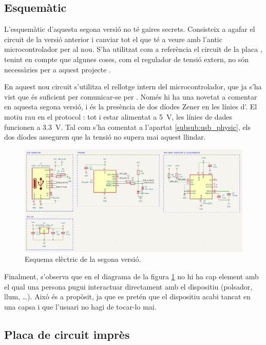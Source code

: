 \subsection{Esquemàtic}

L'esquemàtic d'aquesta segona versió no té gaires secrets. Consisteix a agafar
el circuit de la versió anterior i canviar tot el que té a veure amb l'antic
microcontrolador per al nou. S'ha utilitzat com a referència el circuit de la
placa , tenint en compte que algunes coses, com el regulador de
tensió extern, no són necessàries per a aquest projecte \cite{Digispark}.

En aquest nou circuit s'utilitza el rellotge intern del microcontrolador, que
ja s'ha vist que és suficient per comunicar-se per . Només hi ha
una novetat a comentar en aquesta segona versió, i és la presència de dos
díodes Zener en les línies d'. El motiu rau en el protocol :
tot i estar alimentat a \SI[round-mode=places,round-precision=0]{5}{\volt},
les línies de dades funcionen a
\SI[round-mode=places,round-precision=1]{3.3}{\volt}. Tal com
s'ha comentat a l'apartat \ref{subsub:usb_physic}, els dos díodes asseguren
que la tensió no supera mai aquest llindar.

\begin{figure}[ht]
    \centering
    \includegraphics[width=1\textwidth]{images/kicad/gyro2_sch.png}
    \caption{Esquema elèctric de la segona versió.}
    \label{fig:sch_v2}
\end{figure}

Finalment, s'observa que en el diagrama de la figura \ref{fig:sch_v2}
no hi ha cap element amb el qual una
persona pugui interactuar directament amb el dispositiu (polsador, llum, \dots).
Això és a propòsit, ja que es pretén que el dispositiu acabi tancat en una capsa
i que l'usuari no hagi de tocar-lo mai.

\subsection{Placa de circuit imprès}

